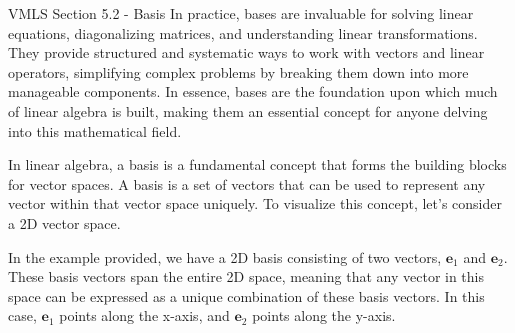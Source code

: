 \begin{notes}{VMLS Section 5.2 - Basis}
    In practice, bases are invaluable for solving linear equations, diagonalizing matrices, and understanding linear transformations. They provide structured and systematic ways to work with vectors 
    and linear operators, simplifying complex problems by breaking them down into more manageable components. In essence, bases are the foundation upon which much of linear algebra is built, making 
    them an essential concept for anyone delving into this mathematical field.

    \begin{highlight}
        In linear algebra, a basis is a fundamental concept that forms the building blocks for vector spaces. A basis is a set of vectors that can be used to represent any vector within that vector space 
        uniquely. To visualize this concept, let's consider a 2D vector space.
    
        \begin{center}
        \end{center}
    
        In the example provided, we have a 2D basis consisting of two vectors, $\mathbf{e}_1$ and $\mathbf{e}_2$. These basis vectors span the entire 2D space, meaning that any vector in this space can be 
        expressed as a unique combination of these basis vectors. In this case, $\mathbf{e}_1$ points along the x-axis, and $\mathbf{e}_2$ points along the y-axis.


\end{highlight}
\end{notes}
